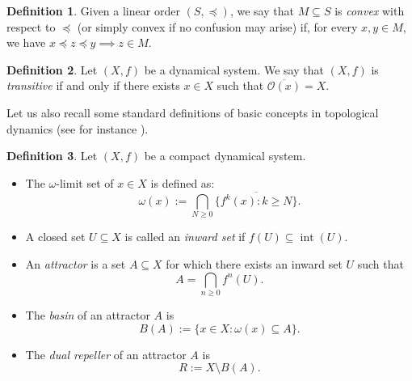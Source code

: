 \documentclass[10pt,a4paper]{article}
\theoremstyle{definition}
\newtheorem{defi}{Definition}[section]
\theoremstyle{remark}
\theoremstyle{plain}
\begin{document}
\begin{defi}
    Given a linear order $(S,\preceq)$, we say that $M\subseteq S$ is \textit{convex} with respect to $\preceq$ (or simply convex if no confusion may arise) if, for every $x,y\in M$, we have $x\preceq z\preceq y\implies z\in M$. 
\end{defi}

\begin{defi}
    Let $(X, f)$ be a dynamical system. We say that $(X,f)$ is \emph{transitive} if and only if there exists $x\in X$ such that $\overline{\mathcal{O}(x)}=X$.
\end{defi}

Let us also recall some standard definitions of basic concepts in topological dynamics (see for instance \cite{kurka03}). 

\begin{defi}
    Let $(X,f)$ be a compact dynamical system. 
\begin{itemize}
    \item  The $\omega$-limit set of $x\in X$ is defined as:
    $$\omega(x) := \bigcap_{N\geq 0} \overline{\{f^k(x) : k\ge N\}}.$$ 

    \item A closed set $U\subseteq X$ is
    called an \emph{inward set} if $f(U)\subseteq\operatorname{int}(U)$. 

    \item  An \emph{attractor} is a set $A\subseteq X$ for which there exists 
    an inward set $U$ such that
    $$A = \bigcap_{n\geq 0} f^n(U).$$

    \item The \emph{basin} of an attractor $A$ is
    $$B(A) := \{x\in X : \omega(x)\subseteq A\}.$$

    \item     The \emph{dual repeller} of an attractor $A$ is
    $$R := X \setminus B(A).$$
\end{itemize}
\end{defi}
\end{document}
